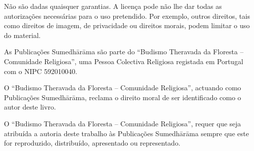 {Não são dadas quaisquer garantias. A licença pode não lhe dar todas as autorizações necessárias para o uso pretendido. Por exemplo, outros direitos, tais como direitos de imagem, de privacidade ou direitos morais, podem limitar o uso do material.

As Publicações Sumedhārāma são parte do “Budismo Theravada da Floresta -- Comunidade Religiosa”, uma Pessoa Colectiva Religiosa registada em Portugal com o NIPC 592010040.

O “Budismo Theravada da Floresta -- Comunidade Religiosa”, actuando como Publicações Sumedhārāma, reclama o direito moral de ser identiﬁcado como o autor deste livro.

O “Budismo Theravada da Floresta -- Comunidade Religiosa”, requer que seja atribuída a autoria deste trabalho às Publicações Sumedhārāma sempre que este for reproduzido, distribuído, apresentado ou representado.

}
